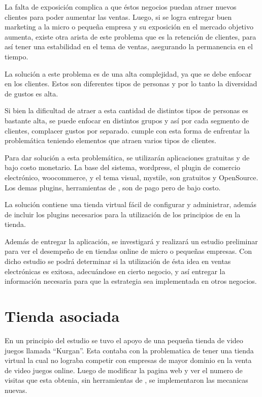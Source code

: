 La falta de exposición complica a que éstos negocios puedan atraer nuevos clientes
para poder aumentar las ventas.
Luego, si se logra entregar buen marketing a la micro o pequeña empresa y su
exposición en el mercado objetivo aumenta, existe otra arista de este problema
que es la retención de clientes, para así tener una estabilidad en el tema
de ventas, asegurando la permanencia en el tiempo.

La solución a este problema es de una alta complejidad, ya que se debe enfocar en
los clientes.
Estos son diferentes tipos de personas y por lo tanto la diversidad de gustos es
alta.

Si bien la dificultad de atraer a esta cantidad de distintos tipos de personas
es bastante alta, se puede enfocar en distintos grupos y así por cada segmento
de clientes, complacer gustos por separado.
{\GAM} cumple con esta forma de enfrentar la problemática teniendo elementos que
atraen varios tipos de clientes.

Para dar solución a esta problemática, se utilizarán aplicaciones gratuitas y de
bajo costo monetario. La base del sistema, wordpress, el plugin de comercio
electrónico, woocommerce, y el tema visual, mystile, son gratuitos y OpenSource.
Los demas plugins, herramientas de {\GAM}, son de pago pero de bajo costo.

La solución contiene una tienda virtual fácil de configurar y administrar,
además de incluir los plugins necesarios para la utilización de los principios
de {\GAM} en la tienda.

Además de entregar la aplicación, se investigará y realizará un estudio preliminar
para ver el desempeño de {\GAM} en tiendas online de micro o pequeñas empresas.
Con dicho estudio se podrá determinar si la utilización de ésta idea en ventas
electrónicas es exitosa, adecuándose en cierto negocio,
y así entregar la información necesaria para que la estrategia sea implementada
en otros negocios.

\section{Tienda asociada}

En un principio del estudio se tuvo el apoyo de una pequeña tienda de video juegos
llamada ``Kurgan''. Esta contaba con la problematica de tener una tienda virtual
la cual no lograba competir con empresas de mayor dominio en la venta de video juegos
online. Luego de modificar la pagina web y ver el numero de visitas que esta obtenia, sin
herramientas de {\GAM}, se implementaron las mecanicas nuevas.

